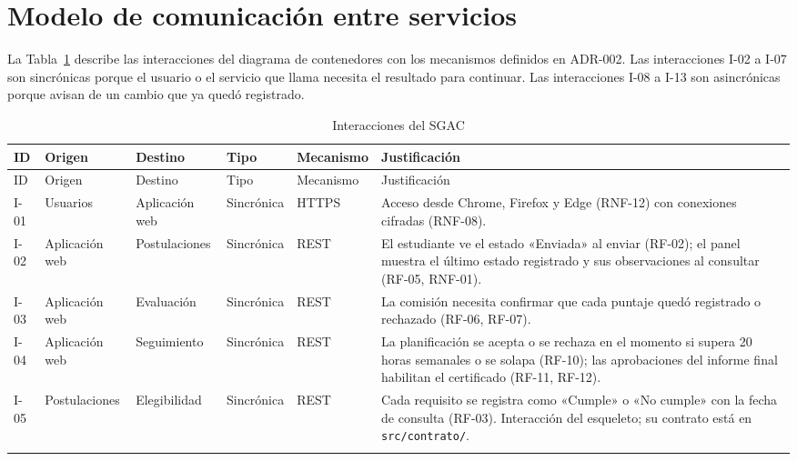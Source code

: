 \section{Modelo de comunicación entre servicios}
\label{sec:modelo-comunicacion}

La Tabla~\ref{tab:comunicacion} describe las interacciones del diagrama de contenedores con los mecanismos definidos en ADR-002. Las interacciones I-02 a I-07 son sincrónicas porque el usuario o el servicio que llama necesita el resultado para continuar. Las interacciones I-08 a I-13 son asincrónicas porque avisan de un cambio que ya quedó registrado.

\begingroup
\small
\begin{longtable}{@{}>{\raggedright\arraybackslash}p{.06\linewidth}>{\raggedright\arraybackslash}p{.15\linewidth}>{\raggedright\arraybackslash}p{.15\linewidth}>{\raggedright\arraybackslash}p{.13\linewidth}>{\raggedright\arraybackslash}p{.12\linewidth}>{\raggedright\arraybackslash}p{.23\linewidth}@{}}
\caption{Interacciones del SGAC}\label{tab:comunicacion}\\
\toprule
ID & Origen & Destino & Tipo & Mecanismo & Justificación \\
\midrule
\endfirsthead
\toprule
ID & Origen & Destino & Tipo & Mecanismo & Justificación \\
\midrule
\endhead
\bottomrule
\endfoot
I-01 & Usuarios & Aplicación web & Sincrónica & HTTPS & Acceso desde Chrome, Firefox y Edge (RNF-12) con conexiones cifradas (RNF-08). \\ \addlinespace
I-02 & Aplicación web & Postulaciones & Sincrónica & REST & El estudiante ve el estado «Enviada» al enviar (RF-02); el panel muestra el último estado registrado y sus observaciones al consultar (RF-05, RNF-01). \\ \addlinespace
I-03 & Aplicación web & Evaluación & Sincrónica & REST & La comisión necesita confirmar que cada puntaje quedó registrado o rechazado (RF-06, RF-07). \\ \addlinespace
I-04 & Aplicación web & Seguimiento & Sincrónica & REST & La planificación se acepta o se rechaza en el momento si supera 20 horas semanales o se solapa (RF-10); las aprobaciones del informe final habilitan el certificado (RF-11, RF-12). \\ \addlinespace
I-05 & Postulaciones & Elegibilidad & Sincrónica & REST & Cada requisito se registra como «Cumple» o «No cumple» con la fecha de consulta (RF-03). Interacción del esqueleto; su contrato está en \texttt{src/contrato/}. \\ \addlinespace

\end{longtable}
